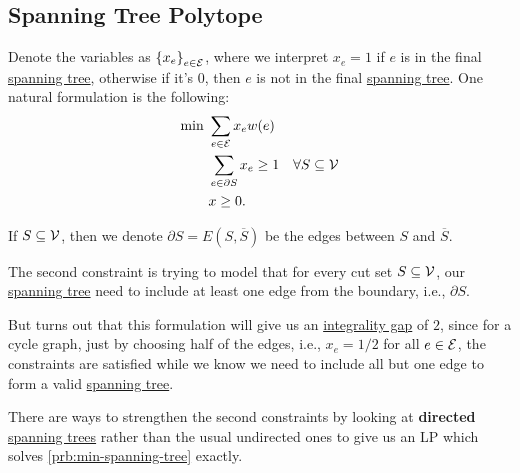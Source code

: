 \subsection{Spanning Tree Polytope}
Denote the variables as \(\left\{ x_e \right\} _{e\in \mathcal{\MakeUppercase{e}} }\), where we interpret \(x_e = 1\) if \(e\) is in the final \hyperref[def:spanning-tree]{spanning tree}, otherwise if it's \(0\), then \(e\) is not in the final \hyperref[def:spanning-tree]{spanning tree}. One natural formulation is the following:
\begin{align*}
	\min~ & \sum_{e\in \mathcal{\MakeUppercase{e}} } x_e w(e)                                  \\
	      & \sum_{e\in \partial S} x_e \geq 1                 & \forall S\subseteq \mathcal{V} \\
	      & x \geq 0.
\end{align*}
\begin{notation}
	If \(S \subseteq \mathcal{\MakeUppercase{v}} \), then we denote \(\partial S = E(S, \overline{S} )\) be the edges between \(S\) and \(\overline{S} \).
\end{notation}
\begin{intuition}
	The second constraint is trying to model that for every cut set \(S \subseteq \mathcal{\MakeUppercase{v}} \), our \hyperref[def:spanning-tree]{spanning tree} need to include at least one edge from the boundary, i.e., \(\partial S\).
\end{intuition}

But turns out that this formulation will give us an \hyperref[def:integrality-gap]{integrality gap} of \(2\), since for a cycle graph, just by choosing half of the edges, i.e., \(x_e = 1 / 2\) for all \(e\in \mathcal{\MakeUppercase{e}} \), the constraints are satisfied while we know we need to include all but one edge to form a valid \hyperref[def:spanning-tree]{spanning tree}.

\begin{remark}
	There are ways to strengthen the second constraints by looking at \textbf{directed} \hyperref[def:spanning-tree]{spanning trees} rather than the usual undirected ones to give us an LP which solves \autoref{prb:min-spanning-tree} exactly.
\end{remark}

